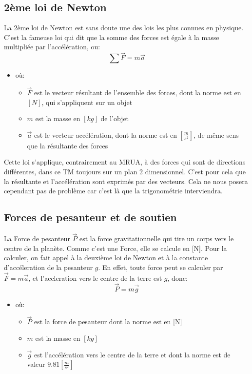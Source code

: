 \documentclass{article}
\begin{document}
\subsection{2{ème} loi de Newton}

La 2ème loi de Newton est sans doute une des lois les plus connues en physique. C'est la fameuse loi qui dit que la somme des forces est égale à la masse multipliée par l'accélération, ou: 
\begin{equation}
\label{2nd-N}
\sum \vec{F} = m\vec{a}
\end{equation}
\begin{itemize}
    \item où:
    \begin{itemize}
        \item $\vec{F}$ est le vecteur résultant de l'ensemble des forces, dont la norme est en $[N]$, qui s'appliquent sur un objet
        \item $m$ est la masse en $[kg]$ de l'objet
        \item $\vec{a}$ est le vecteur accélération, dont la norme est en $[\frac{m}{s^2}]$, de même sens que la résultante des forces    
    \end{itemize}
\end{itemize}
Cette loi s'applique, contrairement au MRUA, à des forces qui sont de directions différentes, dans ce TM toujours sur un plan 2 dimensionnel. C'est pour cela que la résultante et l'accélération sont exprimés par des vecteurs. 
\newline Cela ne nous posera cependant pas de problème car c'est là que la trigonométrie interviendra.



\subsection{Forces de pesanteur et de soutien}

La Force de pesanteur $\vec{P}$ est la force gravitationnelle qui tire un corps vers le centre de la planète. Comme c'est une Force, elle se calcule en [N]. Pour la calculer, on fait appel à la deuxième loi de Newton et à la constante d'accéleration de la pesanteur $g$. En effet, toute force peut se calculer par $\vec{F} = m\vec{a}$, et l'accleration vers le centre de la terre est $g$, donc: 
\begin{equation}
    \label{Pesant}
    \vec{P}=m\vec{g}
\end{equation}
\begin{itemize}
    \item où:
    \begin{itemize}
        \item $\vec{P}$ est la force de pesanteur dont la norme est en [N]
        \item $m$ est la masse en $[kg]$
        \item $\vec{g}$ est l'accélération vers le centre de la terre et dont la norme est de valeur $9.81 [\frac{m}{s^2}]$
    \end{itemize}
\end{itemize}
\end{document}
